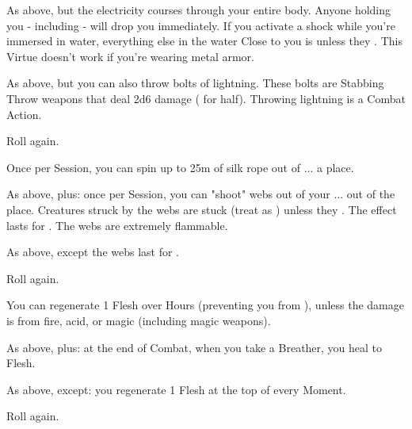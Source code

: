 \begin{multicols*}{2}
 As above, but the electricity courses through your entire body. Anyone holding you - including  - will drop you immediately.  If you activate a shock while you're immersed in water, everything else in the water Close to you is  unless they . This Virtue doesn't work if you're wearing metal armor.

 As above, but you can also throw bolts of lightning. These bolts are Stabbing \FOC Throw weapons that deal 2d6 damage ( for half). Throwing lightning is a Combat Action.

 Roll again.


\NC[Name=Spin Silk]

 Once per Session, you can spin up to 25m of silk rope out of ... a place.

 As above, plus: once per Session, you can "shoot" webs out of your ... out of the place.  Creatures struck by the webs are stuck (treat as ) unless they .  The effect lasts for .  The webs are extremely flammable.

 As above, except the webs last for .

 Roll again.

\NC[Name=Troll Blood]

 You can regenerate 1 Flesh over Hours (preventing you from ), unless the damage is from fire, acid, or magic (including magic weapons).

 As above, plus:  at the end of Combat, when you take a Breather, you heal to \MAX Flesh.

 As above, except: you regenerate 1 Flesh at the top of every Moment.

 Roll again.

\newpage

\end{multicols*}
\begin{center}
\end{center}
